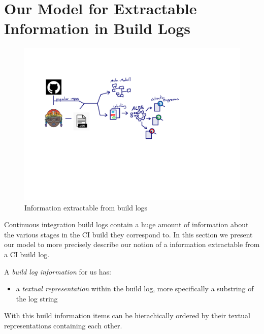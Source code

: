 \documentclass[\myrootdir/main.tex]{subfiles}
\begin{document}
\section{Our Model for Extractable Information in Build Logs}
\begin{figure}[h]
  \centering
\includegraphics[page=2, width=\textwidth, trim={0.5cm 0.5cm 0.5cm 0.5cm}, clip]{img/flow-of-research.pdf}
  \caption{Information extractable from build logs}
  \label{fig:build-log-information-draft}
\end{figure}
Continuous integration build logs contain a huge amount of information about the various stages in the CI build they correspond to. In this section we present our model to more precisely describe our notion of a information extractable from a CI build log.

A \emph{build log information} for us has:
\begin{itemize}
	\item a \emph{textual representation} within the build log, more specifically a substring of the log string
\end{itemize}
With this build information items can be hierachically ordered by their textual representations containing each other.
\end{document}
